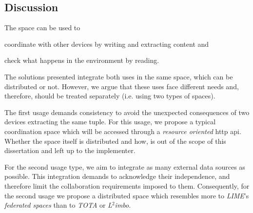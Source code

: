 \subsection{Discussion}

The space can be used to
\begin{enumerate*}[label=\itshape(\arabic*\upshape)]
  \item coordinate with other devices by writing and extracting content and
  \item check what happens in the environment by reading.
\end{enumerate*}
The solutions presented integrate both uses in the same space, which can be distributed or not.
However, we argue that these uses face different needs and, therefore, should be treated separately (i.e. using two types of spaces).


The first usage demands consistency to avoid the unexpected consequences of two devices extracting the same tuple.
For this usage, we propose a typical coordination space which will be accessed through a \emph{resource oriented} \ac{http} \ac{api}.
Whether the space itself is distributed and how, is out of the scope of this dissertation and left up to the implementer.


For the second usage type, we aim to integrate as many external data sources as possible.
This integration demands to acknowledge their independence, and therefore limit the collaboration requirements imposed to them.
Consequently, for the second usage we propose a distributed space which resembles more to \emph{LIME}'s \emph{federated spaces} than to \emph{TOTA} or \emph{L$^2$imbo}.


